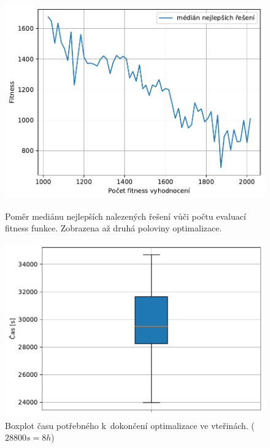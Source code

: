 \begin{figure}[H]
    \begin{minipage}[t]{0.475\linewidth}
    	\includegraphics[width=\textwidth]{obrazky-figures/statistics/HIFU/flower/15/CMAES/bestsToFitness_1.pdf}
    	\caption{Poměr mediánu nejlepších nalezených řešení vůči počtu evaluací fitness funkce. Zobrazena až druhá poloviny optimalizace.}
    	\label{fg:hifu:flower:cmaes:fitPerf}
    \end{minipage}
    \hfill
    \begin{minipage}[t]{0.475\linewidth}
        \includegraphics[width=\linewidth]{obrazky-figures/statistics/HIFU/flower/15/CMAES/timeBoxplot_WithOutliers.pdf}
        \caption{Boxplot času potřebného k~dokončení optimalizace ve vteřinách. ($28800s = 8h$)}
        \label{fg:hifu:flower:cmaes:time}
    \end{minipage}
\end{figure}

